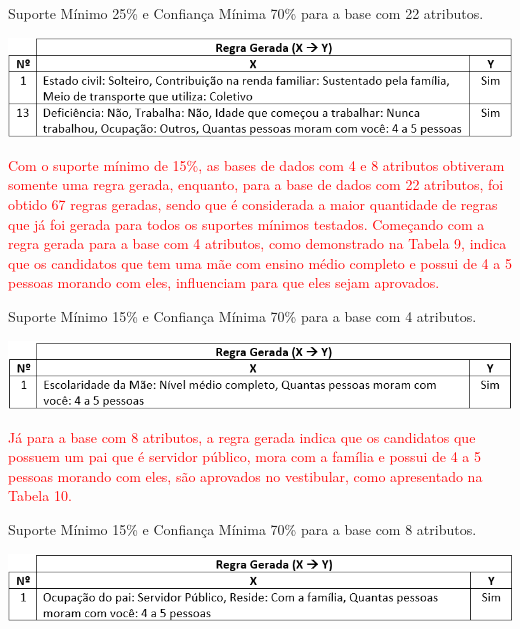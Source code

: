 \par
\begin{table}[!htp]
	\begin{center}
    \caption{\label{fig:waveform_fig} Suporte Mínimo 25\% e Confiança Mínima 70\% para a base com 22 atributos.}
	\includegraphics[scale=0.75]{Figuras/Suporte_25_atributos_22.png}
	\end{center}
\end{table}

\par
\textcolor{red}{Com o suporte mínimo de 15\%, as bases de dados com 4 e 8 atributos obtiveram somente uma regra gerada, enquanto, para a base de dados com 22 atributos, foi obtido 67 regras geradas, sendo que é considerada a maior quantidade de regras que já foi gerada para todos os suportes mínimos testados. Começando com a regra gerada para a base com 4 atributos, como demonstrado na Tabela 9, indica que os candidatos que tem uma mãe com ensino médio completo e possui de 4 a 5 pessoas morando com eles, influenciam para que eles sejam aprovados.}

\par
\begin{table}[!htp]
	\begin{center}
    \caption{\label{fig:waveform_fig} Suporte Mínimo 15\% e Confiança Mínima 70\% para a base com 4 atributos.}
	\includegraphics[scale=0.75]{Figuras/Suporte_15_atributos_4.png}
	\end{center}
\end{table}

\par
\textcolor{red}{Já para a base com 8 atributos, a regra gerada indica que os candidatos que possuem um pai que é servidor público, mora com a família e possui de 4 a 5 pessoas morando com eles, são aprovados no vestibular, como apresentado na Tabela 10.}

\par
\begin{table}[!htp]
	\begin{center}
    \caption{\label{fig:waveform_fig} Suporte Mínimo 15\% e Confiança Mínima 70\% para a base com 8 atributos.}
	\includegraphics[scale=0.75]{Figuras/Suporte_15_atributos_9.png}
	\end{center}
\end{table}

